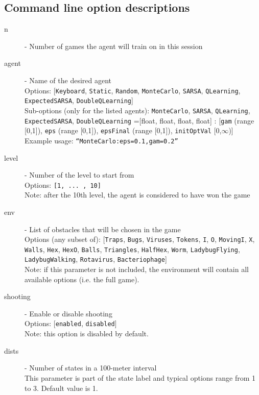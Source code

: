 \subsection{Command line option descriptions}
\begin{description}
\item[n] - Number of games the agent will train on in this session \label{opt:n}
\item[agent] - Name of the desired agent \label{opt:agent}\\
Options: [\texttt{Keyboard}, \texttt{Static}, \texttt{Random}, \texttt{MonteCarlo}, \texttt{SARSA}, \texttt{QLearning}, \\ \texttt{ExpectedSARSA}, \texttt{DoubleQLearning}]\\
Sub-options (only for the listed agents):
\texttt{MonteCarlo}, \texttt{SARSA}, \texttt{QLearning}, \texttt{ExpectedSARSA}, \texttt{DoubleQLearning}
=[float, float, float, float] :
[\texttt{gam} (range [0,1]), \texttt{eps} (range [0,1]), \texttt{epsFinal} (range [0,1]), \texttt{initOptVal} [0,$\infty$)]\\
Example usage: \texttt{``MonteCarlo:eps=0.1,gam=0.2''}
\item[level] - Number of the level to start from \label{opt:level}\\
Options: \texttt{[1, ... , 10]}\\
Note: after the 10th level, the agent is considered to have won the game
\item[env] - List of obstacles that will be chosen in the game \label{opt:env}\\
Options (any subset of): [\texttt{Traps}, \texttt{Bugs}, \texttt{Viruses}, \texttt{Tokens},
\texttt{I}, \texttt{O}, \texttt{MovingI}, \texttt{X}, \texttt{Walls}, \texttt{Hex},
\texttt{HexO}, \texttt{Balls}, \texttt{Triangles}, \texttt{HalfHex},
\texttt{Worm}, \texttt{LadybugFlying}, \texttt{LadybugWalking},
\texttt{Rotavirus}, \texttt{Bacteriophage}]\\
Note: if this parameter is not included, the environment will contain all available options (i.e. the full game).
\item[shooting] - Enable or disable shooting \label{opt:shooting}\\
Options: [\texttt{enabled}, \texttt{disabled}]\\
Note: this option is disabled by default.
\item[dists] - Number of states in a 100-meter interval \label{opt:dists}\\
This parameter is part of the state label and typical options range from 1 to 3. Default value is 1.

\end{description}
